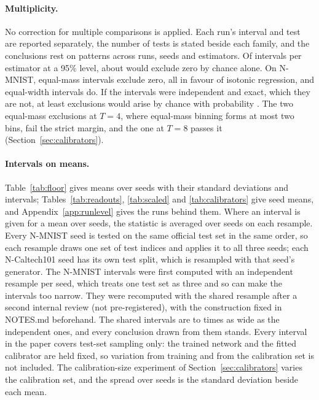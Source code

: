 \documentclass[10pt]{article}
\begin{document}
\paragraph{Multiplicity.} No correction for multiple comparisons is applied. Each run's interval
and test are reported separately, the number of tests is stated beside each family, and the
conclusions rest on patterns across runs, seeds and estimators. Of \runsTotal{} intervals per %
estimator at a 95\% level, about \expectedFalse{} would exclude zero by chance alone. %
On N-MNIST, \emExclNm{} equal-mass intervals exclude zero, all in favour of isotonic regression, and %
\ewExclNm{} equal-width intervals do. If the intervals were independent and exact, which they are
not, at least \emExclNm{} exclusions would arise by chance with probability \emExclTail. The two %
equal-mass exclusions at $T=4$, where equal-mass binning forms at most two bins, fail the strict
margin, and the one at $T=8$ passes it (Section~\ref{sec:calibrators}).

\paragraph{Intervals on means.} Table~\ref{tab:floor} gives means over seeds with their standard
deviations and intervals; Tables~\ref{tab:readouts}, \ref{tab:scaled} and \ref{tab:calibrators}
give seed means, and Appendix~\ref{app:runlevel} gives the runs behind them. Where an interval is
given for a mean over seeds, the statistic is averaged over seeds on each resample. Every N-MNIST
seed is tested on the same official test set in the same order, so each resample draws one set of
test indices and applies it to all three seeds; each N-Caltech101 seed has its own test split,
which is resampled with that seed's generator. The N-MNIST intervals were first computed with an
independent resample per seed, which treats one test set as three and so can make the intervals
too narrow. They were recomputed with the shared resample after a second internal review (not %
pre-registered), with the construction fixed in NOTES.md beforehand. The shared intervals are %
\shWidthMin{} to \shWidthMax{} times as wide as the independent ones, and every conclusion drawn
from them stands. Every interval in the paper covers
test-set sampling only: the trained network and the fitted calibrator are held fixed, so
variation from training and from the calibration set is not included. The calibration-size
experiment of Section~\ref{sec:calibrators} varies the calibration set, and the spread over seeds
is the standard deviation beside each mean.
\end{document}
